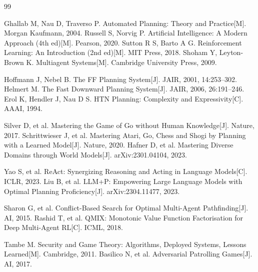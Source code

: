 \documentclass[a4paper,12pt,openany]{ctexbook}
\theoremstyle{definition}
\theoremstyle{plain}
\begin{document}
\begin{thebibliography}{99}

 Ghallab M, Nau D, Traverso P. Automated Planning: Theory and Practice[M]. Morgan Kaufmann, 2004.
 Russell S, Norvig P. Artificial Intelligence: A Modern Approach (4th ed)[M]. Pearson, 2020.
 Sutton R S, Barto A G. Reinforcement Learning: An Introduction (2nd ed)[M]. MIT Press, 2018.
 Shoham Y, Leyton-Brown K. Multiagent Systems[M]. Cambridge University Press, 2009.

 Hoffmann J, Nebel B. The FF Planning System[J]. JAIR, 2001, 14:253--302.
 Helmert M. The Fast Downward Planning System[J]. JAIR, 2006, 26:191--246.
 Erol K, Hendler J, Nau D S. HTN Planning: Complexity and Expressivity[C]. AAAI, 1994.

 Silver D, et al. Mastering the Game of Go without Human Knowledge[J]. Nature, 2017.
 Schrittwieser J, et al. Mastering Atari, Go, Chess and Shogi by Planning with a Learned Model[J]. Nature, 2020.
 Hafner D, et al. Mastering Diverse Domains through World Models[J]. arXiv:2301.04104, 2023.

 Yao S, et al. ReAct: Synergizing Reasoning and Acting in Language Models[C]. ICLR, 2023.
 Liu B, et al. LLM+P: Empowering Large Language Models with Optimal Planning Proficiency[J]. arXiv:2304.11477, 2023.

 Sharon G, et al. Conflict-Based Search for Optimal Multi-Agent Pathfinding[J]. AI, 2015.
 Rashid T, et al. QMIX: Monotonic Value Function Factorisation for Deep Multi-Agent RL[C]. ICML, 2018.

 Tambe M. Security and Game Theory: Algorithms, Deployed Systems, Lessons Learned[M]. Cambridge, 2011.
 Basilico N, et al. Adversarial Patrolling Games[J]. AI, 2017.


\end{thebibliography}
\end{document}
